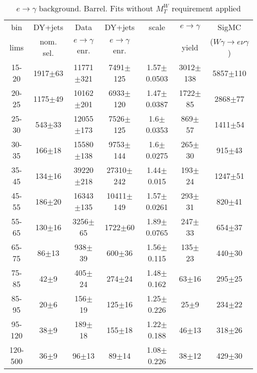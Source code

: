 \begin{table}[h]
  \scriptsize
  \begin{center}
  \caption{$e\rightarrow\gamma$ background. Barrel. Fits without $M_T^W$ requirement applied } 
   \begin{tabular}{|c|c|c|c|c|c|c|}
 bin  & DY+jets    & Data                      & DY+jets & scale & $e\rightarrow\gamma$ & SigMC\\ 
 lims & nom. sel. & $e\rightarrow\gamma$ enr. & $e\rightarrow\gamma$ enr. & & yield & ($W\gamma\rightarrow e\nu\gamma$)\\ \hline
15-20 & 1917$\pm$63 & 11771$\pm$321 & 7491$\pm$125 & 1.57$\pm$0.0503& 3012$\pm$138& 5857$\pm$110 \\ \hline
20-25 & 1175$\pm$49 & 10162$\pm$201 & 6933$\pm$120 & 1.47$\pm$0.0387& 1722$\pm$85& 2868$\pm$77 \\ \hline
25-30 & 543$\pm$33 & 12055$\pm$173 & 7526$\pm$125 & 1.6$\pm$0.0353& 869$\pm$57& 1411$\pm$54 \\ \hline
30-35 & 166$\pm$18 & 15580$\pm$138 & 9753$\pm$144 & 1.6$\pm$0.0275& 265$\pm$30& 915$\pm$43 \\ \hline
35-45 & 134$\pm$16 & 39220$\pm$218 & 27310$\pm$242 & 1.44$\pm$0.015& 193$\pm$24& 1247$\pm$51 \\ \hline
45-55 & 186$\pm$20 & 16343$\pm$135 & 10411$\pm$149 & 1.57$\pm$0.0261& 293$\pm$31& 820$\pm$41 \\ \hline
55-65 & 130$\pm$16 & 3256$\pm$65 & 1722$\pm$60 & 1.89$\pm$0.0765& 247$\pm$33& 654$\pm$37 \\ \hline
65-75 & 86$\pm$13 & 938$\pm$39 & 600$\pm$36 & 1.56$\pm$0.115& 135$\pm$23& 440$\pm$30 \\ \hline
75-85 & 42$\pm$9 & 405$\pm$24 & 274$\pm$24 & 1.48$\pm$0.162& 63$\pm$16& 295$\pm$25 \\ \hline
85-95 & 20$\pm$6 & 156$\pm$19 & 125$\pm$16 & 1.25$\pm$0.226& 25$\pm$9& 234$\pm$22 \\ \hline
95-120 & 38$\pm$9 & 189$\pm$18 & 155$\pm$18 & 1.22$\pm$0.188& 46$\pm$13& 318$\pm$26 \\ \hline
120-500 & 36$\pm$9 & 96$\pm$13 & 89$\pm$14 & 1.08$\pm$0.226& 38$\pm$12& 429$\pm$30 \\ \hline
  \end{tabular}
  \label{tab:EtoGAMMA_NoWMtCut_0}
  \end{center}
\end{table}

